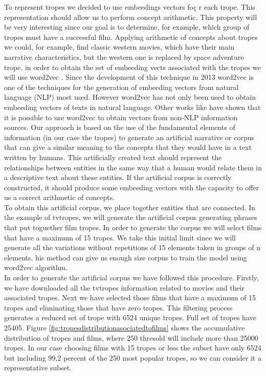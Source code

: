 \documentclass[letterpaper]{article}
\begin{document}
	To represent tropes we decided to use embeedings vectors foç r each trope. This representation should allow us to perform concept arithmetic. This property will be very interesting since our goal is to determine, for example, which group of tropes must have a successful film. Applying arithmetic of concepts about tropes we could, for example, find classic western movies, which have their main narrative characteristics, but the western one is replaced by space adventure trope. in order to obtain the set of embeeding vects associated with the tropes we will use word2vec \cite{mikolov2013}. Since the development of this technique in 2013 word2vec is one of the techniques for the generation of embeeding vectors from natural language (NLP) most used. However word2vec has not only been used to obtain embeeding vectors of texts in natural language. Other works like \cite{kazama2018} have shown that it is possible to use word2vec to obtain vectors from non-NLP information sources. Our approach is based on the use of the fundamental elements of information (in our case the tropes) to generate an artificial narrative or corpus that can give a similar meaning to the concepts that they would have in a text written by humans. This artificially created text should represent the relationships between entities in the same way that a human would relate them in a descriptive text about these entities. If the artificial corpus is correctly constructed, it should produce some embeeding vectors with the capacity to offer us a correct arithmetic of concepts. \\
	To obtain this artificial corpus, we place together entities that are connected. In the example of tvtropes, we will generate the artificial corpus generating phrases that put toguether film tropes. In order to generate the corpus we will select films that have a maximum of 15 tropes. We take this initial limit since we will generate all the variations without repetitions of 15 elements taken in groups of n elements. his method can give us enough size corpus to train the model using word2vec algorithm. \\
	In order to generate the artificial corpus we have followed this procedure. Firstly, we have downloaded all the tvtropes information related to movies and their associated tropes. Next we have selected those films that have a maximum of 15 tropes and eliminating those that have zero tropes. This filtering process generates a reduced set of trope with 6524 unique tropes. Full set of tropes have 25405. Figure  \ref{fig:tropesdistributionasociatedtofilms} shows the accumulative distribution of tropes and films, where 250 thresold will include more than 25000 tropes. In our case choosing films with 15 tropes or less the subset have only 6524 but including 99,2 percent of the 250 most popular tropes, so we can consider it a representative subset.\\
	
\end{document}
